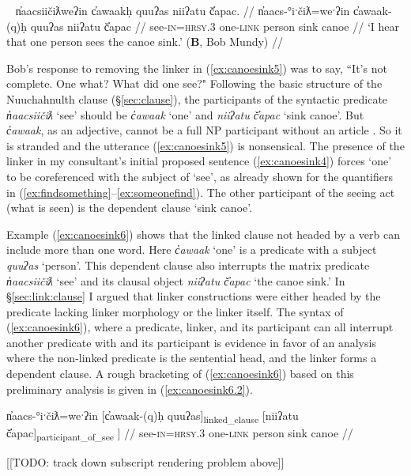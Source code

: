 \ex~ \label{ex:canoesink6}
\begingl
\glpreamble n̓aacsiičiƛweʔin c̓awaakḥ quuʔas niiʔatu č̓apac. //
\gla n̓aacs-°iˑčiƛ=weˑʔin c̓awaak-(q)ḥ quuʔas niiʔatu č̓apac //
\glb see-\textsc{in}=\textsc{hrsy.3} one-\textsc{link} person sink canoe //
\glft `I hear that one person sees the canoe sink.' (\textbf{B}, Bob Mundy) //
\endgl
\xe

Bob's response to removing the linker in (\ref{ex:canoesink5}) was to say, ``It's not complete. One what? What did one see?" Following the basic structure of the Nuuchahnulth clause (\S\ref{sec:clause}), the participants of the syntactic predicate \textit{n̓aacsiičiƛ} `see' should be \textit{c̓awaak} `one' and \textit{niiʔatu č̓apac} `sink canoe'. But \textit{c̓awaak}, as an adjective, cannot be a full NP participant without an article \citep{wojdak2001}. So it is stranded and the utterance (\ref{ex:canoesink5}) is nonsensical. The presence of the linker in my consultant's initial proposed sentence (\ref{ex:canoesink4}) forces `one' to be coreferenced with the subject of `see', as already shown for the quantifiers in (\ref{ex:findsomething}--\ref{ex:someonefind}). The other participant of the seeing act (what is seen) is the dependent clause `sink canoe'.

Example (\ref{ex:canoesink6}) shows that the linked clause not headed by a verb can include more than one word. Here \textit{c̓awaak} `one' is a predicate with a subject \textit{quuʔas} `person'.  This dependent clause also interrupts the matrix predicate \textit{n̓aacsiičiƛ} `see' and its clausal object \textit{niiʔatu č̓apac} `the canoe sink.' In \S\ref{sec:link:clause} I argued that linker constructions were either headed by the predicate lacking linker morphology or the linker itself. The syntax of (\ref{ex:canoesink6}), where a predicate, linker, and its participant can all interrupt another predicate with and its participant is evidence in favor of an analysis where the non-linked predicate is the sentential head, and the linker forms a dependent clause. A rough bracketing of (\ref{ex:canoesink6}) based on this preliminary analysis is given in (\ref{ex:canoesink6.2}).

\ex \label{ex:canoesink6.2}
\begingl
\gla {[}n̓aacs-°iˑčiƛ=weˑʔin {[}c̓awaak-(q)ḥ quuʔas{]\textsubscript{linked\_clause}} {[}niiʔatu č̓apac{]\textsubscript{participant\_of\_see} ]} //
\glb see-\textsc{in}=\textsc{hrsy.3} one-\textsc{link} person sink canoe //
\endgl
\xe

[[TODO: track down subscript rendering problem above]]

